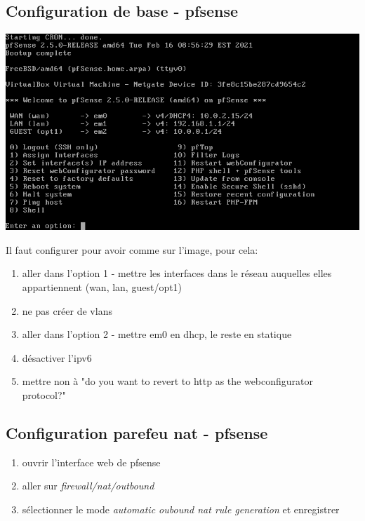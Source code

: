 \documentclass[a4paper]{article}
\begin{document}
\subsection{Configuration de base - pfsense}





\begin{center} \includegraphics[width=0.85\linewidth]{images/pfsense-01.PNG} \end{center}
Il faut configurer pour avoir comme sur l'image, pour cela:
\begin{enumerate}
    \item aller dans l'option 1 - mettre les interfaces dans le réseau auquelles elles appartiennent (wan, lan, guest/opt1)
    \item ne pas créer de vlans
    \item aller dans l'option 2 - mettre em0 en dhcp, le reste en statique
    \item désactiver l'ipv6
    \item mettre non à "do you want to revert to http as the webconfigurator protocol?"
\end{enumerate}










\subsection{Configuration parefeu nat - pfsense}





\begin{enumerate}
    \item ouvrir l'interface web de pfsense
    \item aller sur \textit{firewall/nat/outbound}
    \item sélectionner le mode \textit{automatic oubound nat rule generation} et enregistrer
\end{enumerate}
\end{document}
